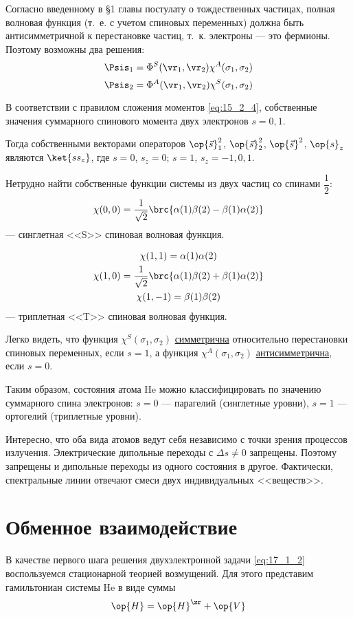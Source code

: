 Согласно введенному в \S 1 главы  постулату о тождественных частицах, полная волновая функция (т.~е. с учетом спиновых переменных) должна быть антисимметричной к перестановке частиц, т.~к. электроны --- это фермионы. Поэтому возможны два решения:
$$
\Psis_1 = \Phi^S(\vr_1, \vr_2) \chi^A(\sigma_1, \sigma_2)
$$
$$
\Psis_2 = \Phi^A(\vr_1, \vr_2) \chi^S(\sigma_1, \sigma_2)
$$

В соответствии с правилом сложения моментов \eqref{eq:15_2_4}, собственные значения суммарного спинового момента двух электронов $s = 0, 1$.

Тогда собственными векторами операторов $\op{\vec{s}}_1^2$, $\op{\vec{s}}_2^2$, $\op{\vec{s}}^2$, $\op{s}_z$ являются $\ket{s s_z}$, где $s = 0$, $s_z = 0$; $s = 1$, $s_z=-1, 0, 1$.

Нетрудно найти собственные функции системы из двух частиц со спинами $\dfrac{1}{2}$:
$$
\chi(0, 0) = \frac{1}{\sqrt{2}}\brc{\alpha(1)\beta(2) - \beta(1)\alpha(2)}
$$
--- синглетная <<S>> спиновая волновая функция.

\begin{gather*}
\chi(1, 1) = \alpha(1)\alpha(2) \\
\chi(1, 0) = \frac{1}{\sqrt{2}}\brc{\alpha(1)\beta(2) + \beta(1)\alpha(2)} \\
\chi(1, -1) = \beta(1)\beta(2)
\end{gather*}
--- триплетная <<T>> спиновая волновая функция.

Легко видеть, что функция $\chi^S(\sigma_1, \sigma_2)$ \underline{симметрична} относительно перестановки спиновых переменных, если $s = 1$, а функция $\chi^A(\sigma_1, \sigma_2)$ \underline{антисимметрична}, если $s = 0$.

Таким образом, состояния атома He можно классифицировать по значению суммарного спина электронов: $s = 0$ --- парагелий (синглетные уровни), $s = 1$ --- ортогелий (триплетные уровни).

Интересно, что оба вида атомов ведут себя независимо с точки зрения процессов излучения. Электрические дипольные переходы с $\Delta s \neq 0$ запрещены. Поэтому запрещены и дипольные переходы из одного состояния в другое. Фактически, спектральные линии отвечают смеси двух индивидуальных <<веществ>>.

\section{Обменное взаимодействие}

В качестве первого шага решения двухэлектронной задачи \eqref{eq:17_1_2} воспользуемся стационарной теорией возмущений. Для этого представим гамильтониан системы He в виде суммы
$$
\op{H} = \op{H}^\zr + \op{V}
$$

